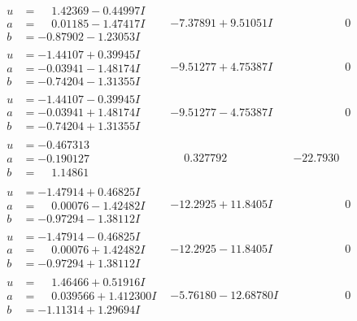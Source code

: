 \documentclass[1p]{elsarticle_modified}
\theoremstyle{definition}
\begin{document}
$$\begin{array}{c|c|c}
\begin{aligned}
u &= \phantom{-}1.42369 - 0.44997 I \\
a &= \phantom{-}0.01185 - 1.47417 I \\
b &= -0.87902 - 1.23053 I\end{aligned}
 & -7.37891 + 9.51051 I & \phantom{-0.000000 } 0 \\ \hline\begin{aligned}
u &= -1.44107 + 0.39945 I \\
a &= -0.03941 - 1.48174 I \\
b &= -0.74204 - 1.31355 I\end{aligned}
 & -9.51277 + 4.75387 I & \phantom{-0.000000 } 0 \\ \hline\begin{aligned}
u &= -1.44107 - 0.39945 I \\
a &= -0.03941 + 1.48174 I \\
b &= -0.74204 + 1.31355 I\end{aligned}
 & -9.51277 - 4.75387 I & \phantom{-0.000000 } 0 \\ \hline\begin{aligned}
u &= -0.467313\phantom{ +0.000000I} \\
a &= -0.190127\phantom{ +0.000000I} \\
b &= \phantom{-}1.14861\phantom{ +0.000000I}\end{aligned}
 & \phantom{-}0.327792\phantom{ +0.000000I} & -22.7930\phantom{ +0.000000I} \\ \hline\begin{aligned}
u &= -1.47914 + 0.46825 I \\
a &= \phantom{-}0.00076 - 1.42482 I \\
b &= -0.97294 - 1.38112 I\end{aligned}
 & -12.2925 + 11.8405 I & \phantom{-0.000000 } 0 \\ \hline\begin{aligned}
u &= -1.47914 - 0.46825 I \\
a &= \phantom{-}0.00076 + 1.42482 I \\
b &= -0.97294 + 1.38112 I\end{aligned}
 & -12.2925 - 11.8405 I & \phantom{-0.000000 } 0 \\ \hline\begin{aligned}
u &= \phantom{-}1.46466 + 0.51916 I \\
a &= \phantom{-}0.039566 + 1.412300 I \\
b &= -1.11314 + 1.29694 I\end{aligned}
 & -5.76180 - 12.68780 I & \phantom{-0.000000 } 0 \\ \hline\begin{aligned}

\end{aligned}
\end{array}$$
\end{document}

